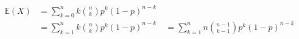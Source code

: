 \documentclass[preview]{standalone}
\begin{document}
\begin{align*}
\mathbb{E} (X) &= \sum ^{n} _{k=0} k {n\choose{k}} p^{k} (1-p)^{n-k}\\ &= \sum ^{n} _{k=1} k {n\choose{k}} p^{k} (1-p)^{n-k}\ &= \sum ^{n} _{k=1} n {{n-1}\choose{k-1}} p^{k} (1-p)^{n-k}\
\end{align*}
\end{document}
